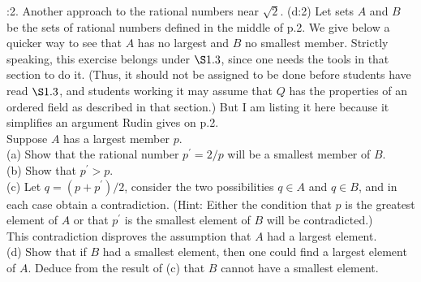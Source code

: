 \documentclass[12pt]{ctexart}
\theoremstyle{definition}
\theoremstyle{plain}
\theoremstyle{remark}
\begin{document}
:2. Another approach to the rational numbers near \(\sqrt{2}\). (d:2)
Let sets \(A\) and \(B\) be the sets of rational numbers defined in the middle of p.2. We give below a quicker way to see that \(A\) has no largest and \(B\) no smallest member. Strictly speaking, this exercise belongs under \(\S 1.3\), since one needs the tools in that section to do it. (Thus, it should not be assigned to be done before students have read \(\S 1.3\), and students working it may assume that \(Q\) has the properties of an ordered field as described in that section.) But I am listing it here because it simplifies an argument Rudin gives on p.2. \\ 
Suppose \(A\) has a largest member \(p\). \\
(a) Show that the rational number \(p^{\prime}=2 / p\) will be a smallest member of \(B\). \\
(b) Show that \(p^{\prime}>p\). \\
(c) Let \(q=\left(p+p^{\prime}\right) / 2\), consider the two possibilities \(q \in A\) and \(q \in B\), and in each case obtain a contradiction. (Hint: Either the condition that \(p\) is the greatest element of \(A\) or that \(p^{\prime}\) is the smallest element of \(B\) will be contradicted.) \\ 
This contradiction disproves the assumption that \(A\) had a largest element. \\
(d) Show that if \(B\) had a smallest element, then one could find a largest element of \(A\). Deduce from the result of (c) that \(B\) cannot have a smallest element.
\end{document}
